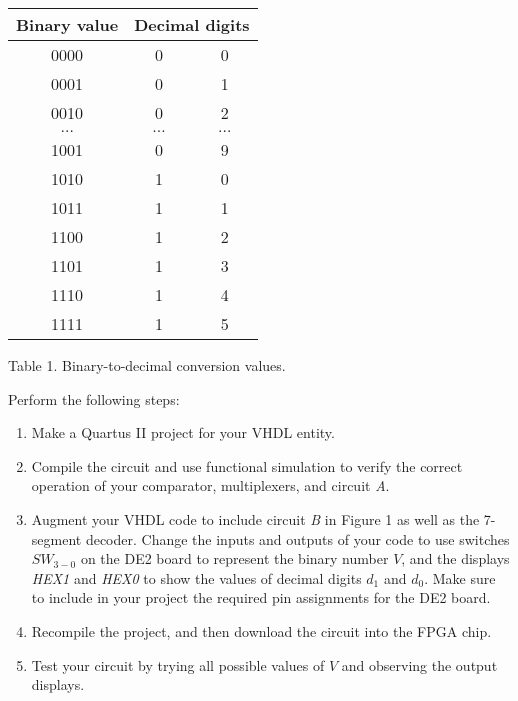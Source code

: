 \documentclass[psfig,10pt,fullpage]{article}
\begin{document}
\begin{center}
\begin{tabular}{c|c c}
Binary value & \multicolumn{2}{c}{Decimal digits}\\ \hline
\hspace{0.75 mm} {\rule[0mm]{0mm}{5mm}0000} & 0 & 0\\ 
\hspace{0.75 mm} 0001 & 0 & 1\\
\hspace{0.75 mm} 0010 & 0 & 2\\
\hspace{0.75 mm} {\rule[0mm]{0mm}{2.5mm}$\ldots$} & $\ldots$ & $\ldots$ \\
\hspace{0.75 mm} {\rule[0mm]{0mm}{5mm}1001} & 0 & 9\\
\hspace{0.75 mm} 1010 & 1 & 0\\
\hspace{0.75 mm} 1011 & 1 & 1\\
\hspace{0.75 mm} 1100 & 1 & 2\\
\hspace{0.75 mm} 1101 & 1 & 3\\
\hspace{0.75 mm} 1110 & 1 & 4\\
\hspace{0.75 mm} 1111 & 1 & 5\\
\end{tabular}
\end{center}

\begin{center}
Table 1. Binary-to-decimal conversion values.
\end{center}

Perform the following steps:

\begin{enumerate}
\item Make a Quartus II project for your VHDL entity.
\item Compile the circuit and use functional simulation to verify the correct operation of
your comparator, multiplexers, and circuit {\it A}.
\item Augment your VHDL code to include circuit {\it B} in Figure 1 as well as the 7-segment
decoder. Change the inputs and outputs of your code to use switches $SW_{3-0}$ on the DE2
board to represent the binary number $V$, and the displays {\it HEX1} and {\it HEX0}
to show the values of decimal digits $d_1$ and $d_0$. Make sure to include in your 
project the required pin assignments for the DE2 board.
\item Recompile the project, and then download the circuit into the FPGA chip.
\item Test your circuit by trying all possible values of $V$ and observing the output
displays.
\end{enumerate}
\end{document}
